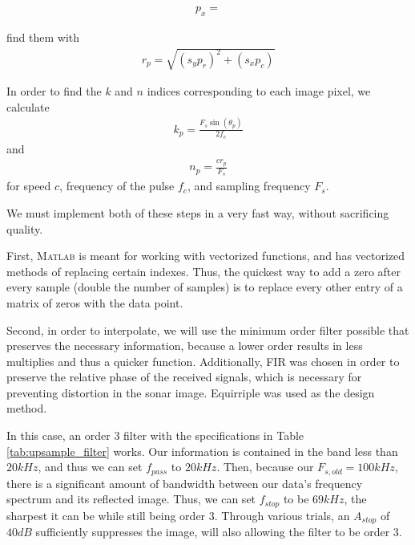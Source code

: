 \begin{align*}
    p_x = 
\end{align*}


find them with
\begin{align*}
    r_p = \sqrt{(s_yp_r)^2 + (s_xp_c)}
\end{align*}


In order to find the $k$ and $n$ indices corresponding to each image pixel, we calculate 
\begin{align*}
    k_p = \frac{F_s\sin(\theta_p)}{2 f_c}
\end{align*}
and
\begin{align*}
    n_p = \frac{cr_p}{F_s}
\end{align*}
for speed $c$, frequency of the pulse $f_c$, and sampling frequency $F_s$.





















We must implement both of these steps in a very fast way, without sacrificing quality.

First, \textsc{Matlab} is meant for working with vectorized functions, and has vectorized methods of replacing certain indexes.  Thus, the quickest way to add a zero after every sample (double the number of samples) is to replace every other entry of a matrix of zeros with the data point.

Second, in order to interpolate, we will use the minimum order filter possible that preserves the necessary information, because a lower order results in less multiplies and thus a quicker function.  Additionally, FIR was chosen in order to preserve the relative phase of the received signals, which is necessary for preventing distortion in the sonar image.  Equirriple was used as the design method.

In this case, an order 3 filter with the specifications in Table \ref{tab:upsample_filter} works.  Our information is contained in the band less than $20 \unit{kHz}$, and thus we can set $f_{pass}$ to $20 \unit{kHz}$.  Then, because our $F_{s,old} = 100 \unit{kHz}$, there is a significant amount of bandwidth between our data's frequency spectrum and its reflected image.  Thus, we can set $f_{stop}$ to be $69 \unit{kHz}$, the sharpest it can be while still being order 3.  Through various trials, an $A_{stop}$ of $40 \unit{dB}$ sufficiently suppresses the image, will also allowing the filter to be order 3.

